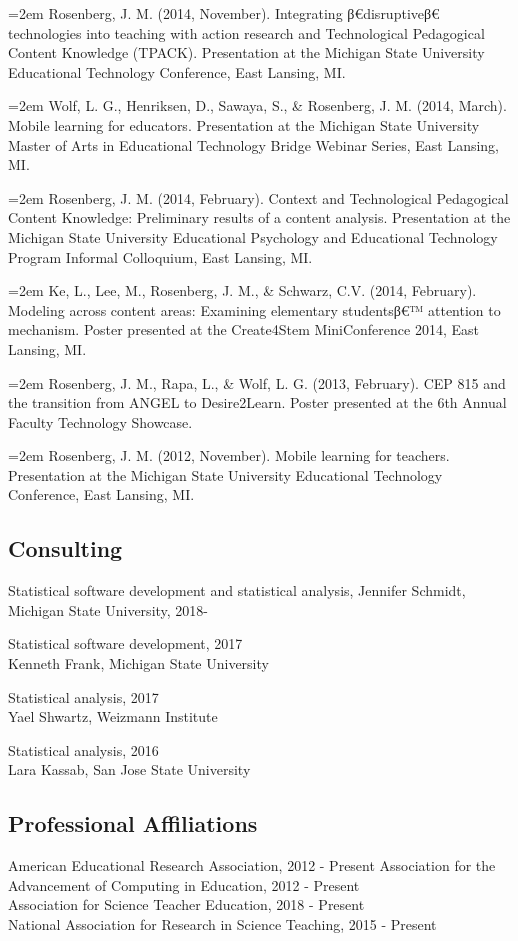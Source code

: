 \documentclass[]{article}
\newcommand{\euro}{€}
\begin{document}
\hangindent=2em Rosenberg, J. M. (2014, November). Integrating
β\euro{}disruptiveβ\euro{} technologies into teaching with action
research and Technological Pedagogical Content Knowledge (TPACK).
Presentation at the Michigan State University Educational Technology
Conference, East Lansing, MI.

\hangindent=2em Wolf, L. G., Henriksen, D., Sawaya, S., \& Rosenberg, J.
M. (2014, March). Mobile learning for educators. Presentation at the
Michigan State University Master of Arts in Educational Technology
Bridge Webinar Series, East Lansing, MI.

\hangindent=2em Rosenberg, J. M. (2014, February). Context and
Technological Pedagogical Content Knowledge: Preliminary results of a
content analysis. Presentation at the Michigan State University
Educational Psychology and Educational Technology Program Informal
Colloquium, East Lansing, MI.

\hangindent=2em Ke, L., Lee, M., Rosenberg, J. M., \& Schwarz, C.V.
(2014, February). Modeling across content areas: Examining elementary
studentsβ\euro{}™ attention to mechanism. Poster presented at the
Create4Stem MiniConference 2014, East Lansing, MI.

\hangindent=2em Rosenberg, J. M., Rapa, L., \& Wolf, L. G. (2013,
February). CEP 815 and the transition from ANGEL to Desire2Learn. Poster
presented at the 6th Annual Faculty Technology Showcase.

\hangindent=2em Rosenberg, J. M. (2012, November). Mobile learning for
teachers. Presentation at the Michigan State University Educational
Technology Conference, East Lansing, MI.

\subsection{Consulting}\label{consulting}

Statistical software development and statistical analysis, Jennifer
Schmidt, Michigan State University, 2018-

Statistical software development, 2017\\
Kenneth Frank, Michigan State University

Statistical analysis, 2017\\
Yael Shwartz, Weizmann Institute

Statistical analysis, 2016\\
Lara Kassab, San Jose State University

\subsection{Professional Affiliations}\label{professional-affiliations}

American Educational Research Association, 2012 - Present Association
for the Advancement of Computing in Education, 2012 - Present\\
Association for Science Teacher Education, 2018 - Present\\
National Association for Research in Science Teaching, 2015 - Present
\end{document}
